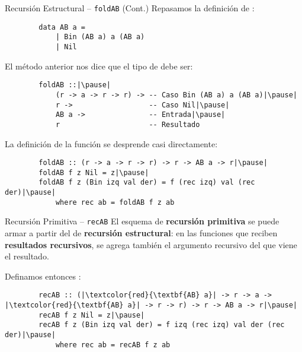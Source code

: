 \begin{frame}[fragile]{Recursión Estructural -- \texttt{foldAB} (Cont.)}
    Repasamos la definición de :

    \begin{verbatim}
        data AB a =
            | Bin (AB a) a (AB a)
            | Nil
    \end{verbatim}

    \pause

    El método anterior nos dice que el tipo de  debe ser:
    
    \begin{verbatim}
        foldAB ::|\pause|
            (r -> a -> r -> r) -> -- Caso Bin (AB a) a (AB a)|\pause|
            r ->                  -- Caso Nil|\pause|
            AB a ->               -- Entrada|\pause|
            r                     -- Resultado
    \end{verbatim}

    \pause

    La definición de la función se desprende casi directamente:
    \begin{verbatim}
        foldAB :: (r -> a -> r -> r) -> r -> AB a -> r|\pause|
        foldAB f z Nil = z|\pause|
        foldAB f z (Bin izq val der) = f (rec izq) val (rec der)|\pause|
            where rec ab = foldAB f z ab
    \end{verbatim}
\end{frame}

\begin{frame}[fragile]{Recursión Primitiva -- \texttt{recAB}}
    El esquema de \textbf{recursión primitiva} se puede armar a partir del de \textbf{recursión estructural}: en las funciones que reciben \textbf{resultados recursivos}, se agrega también el argumento recursivo del que viene el resultado.

    \pause

    Definamos entonces :

    \pause
    
    \begin{verbatim}
        recAB :: (|\textcolor{red}{\textbf{AB} a}| -> r -> a -> |\textcolor{red}{\textbf{AB} a}| -> r -> r) -> r -> AB a -> r|\pause|
        recAB f z Nil = z|\pause|
        recAB f z (Bin izq val der) = f izq (rec izq) val der (rec der)|\pause|
            where rec ab = recAB f z ab
    \end{verbatim}
\end{frame}
